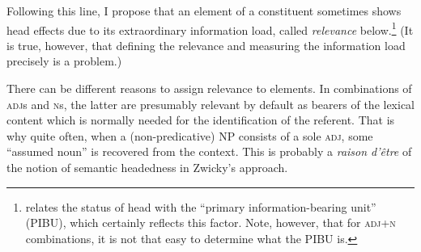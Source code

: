 \documentclass[output=paper,nobabel,draftmode  ,colorlinks, citecolor=brown]{langscibook}
\begin{document}
\noindent
Following this line, I propose that an element of a constituent sometimes shows head effects due to
its extraordinary information load, called \emph{relevance} below.\footnote{\textcite[257--259]{Croft1996, Croft2002} relates the status of head with the ``primary information-bearing unit'' (PIBU), which certainly reflects this factor. Note, however, that for \textsc{adj+n} combinations, it is not that easy to determine what the PIBU is.}
(It is true, however, that defining the relevance and measuring the information load precisely is a
problem.) 

There can be different reasons to assign relevance to elements. In combinations of \textsc{adj}s and
\textsc{n}s, the latter are presumably relevant by default as bearers of the lexical content which
is normally needed for the identification of the referent. That is why quite often, when a
(non-predicative) NP consists of a sole \textsc{adj}, some ``assumed noun'' is recovered from the
context. This is probably a \emph{raison d’être} of the notion of semantic headedness in Zwicky’s
approach. 
\end{document}
